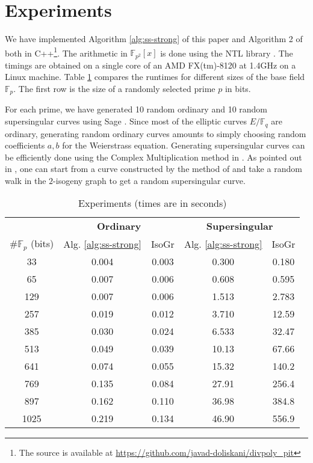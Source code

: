 \documentclass[12pt]{article}
\theoremstyle{plain}
\theoremstyle{definition}
\def\F{\ensuremath{\mathbb{F}}}
\begin{document}


\section{Experiments}

We have implemented Algorithm \ref{alg:ss-strong} of this paper and Algorithm 2 of 
\cite{sutherland2012} both in C++\footnote{The source is available at 
\url{https://github.com/javad-doliskani/divpoly_pit}}. The arithmetic in $\F_{p^2}[x]$ is done 
using the NTL library \cite{shoup2001ntl}. The timings are obtained on a single core of an AMD 
FX(tm)-8120 at 1.4GHz on a Linux machine. Table \ref{table:exper} compares the runtimes for 
different sizes of the base field $\F_p$. The first row is the size of a randomly selected prime 
$p$ in bits. 

For each prime, we have generated 10 random ordinary and 10 random supersingular curves using Sage 
\cite{stein2008sage}. Since most of the elliptic curves $E/\F_q$ are ordinary, generating random 
ordinary curves amounts to simply choosing random coefficients $a, b$ for the Weierstrass equation. 
Generating supersingular curves can be efficiently done using the Complex Multiplication 
method in \cite{broker2009}. As pointed out in \cite{sutherland2012}, one can start from a curve 
constructed by the method of \cite{broker2009} and take a random walk in the $2$-isogeny graph to 
get a random supersingular curve.

\begin{table}[H]
	\centering
	\small
	\begin{tabular}{ccccc}
		& \multicolumn{2}{c}{\bfseries Ordinary} & \multicolumn{2}{c}{\bfseries Supersingular} \\
		\cmidrule(lr){2-3} \cmidrule(lr){4-5} 
		$\#\F_p$ (bits) & Alg. \ref{alg:ss-strong} & IsoGr & Alg. 
		\ref{alg:ss-strong} & IsoGr \\
		\midrule[0.7pt]
		33 & 0.004 & 0.003 & 0.300 & 0.180 \\
		65 & 0.007 & 0.006 & 0.608 & 0.595 \\
		129 & 0.007 & 0.006 & 1.513 & 2.783 \\
		257 & 0.019 & 0.012 & 3.710 & 12.59 \\
		385 & 0.030 & 0.024 & 6.533 & 32.47 \\
		513 & 0.049 & 0.039 & 10.13 & 67.66 \\
		641 & 0.074 & 0.055 & 15.32 & 140.2 \\
		769 & 0.135 & 0.084 & 27.91 & 256.4 \\
		897 & 0.162 & 0.110 & 36.98 & 384.8 \\
		1025 & 0.219 & 0.134 & 46.90 & 556.9 \\		
		\midrule[0.7pt]
	\end{tabular}
	\caption{Experiments (times are in seconds)}
	\label{table:exper}
\end{table}
\end{document}
